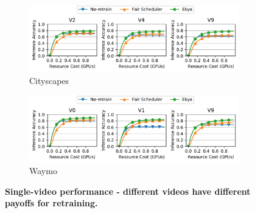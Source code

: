
\begin{figure}
  \centering
  \begin{subfigure}[t]{\linewidth}
    \centering
    \includegraphics[width=\linewidth]{results/singlecam/singlecam_acc_vs_cost_golden_cityscapes.pdf} 
    \caption{\small Cityscapes}
    \label{fig:singlecam-cities-cityscapes-golden}
  \end{subfigure}
  \hfill
  \begin{subfigure}[t]{\linewidth}
    \centering
    \includegraphics[width=\linewidth]{results/singlecam/singlecam_acc_vs_cost_golden_waymo.pdf}
    \caption{\small Waymo}
    \label{fig:singlecam-cities-waymo-golden}
  \end{subfigure}
  \caption{\bf\small Single-video performance - different videos have different payoffs for retraining.}%
  \label{fig:singlecam-cities}
\end{figure}


